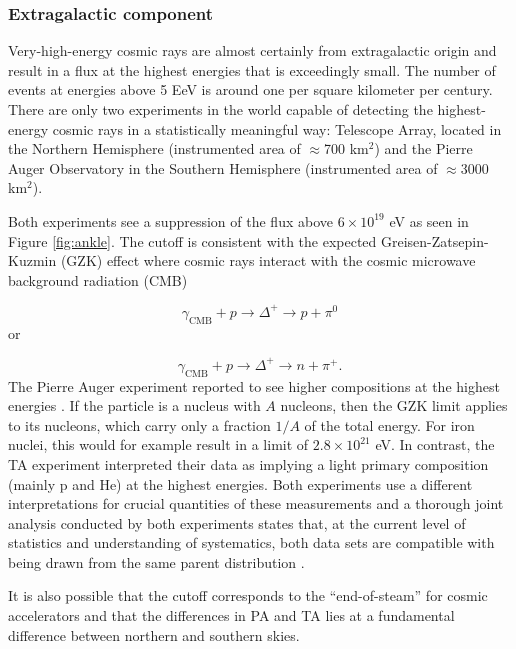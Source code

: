 \subsubsection{Extragalactic component}
\label{subsec:extragalactic}
Very-high-energy cosmic rays are almost certainly from extragalactic origin and result in a flux at the highest energies that is exceedingly small. The number of events at energies above 5 EeV is around one per square kilometer per century. There are only two experiments in the world capable of detecting the highest-energy cosmic rays in a statistically meaningful way: Telescope Array, located in the Northern Hemisphere (instrumented area of $\approx$700 km$^2$) and the Pierre Auger Observatory in the Southern Hemisphere (instrumented area of $\approx$3000 km$^2$).

Both experiments see a suppression of the flux above $6 \times 10^{19}$ eV as seen in Figure \ref{fig:ankle}. The cutoff is consistent with the expected Greisen-Zatsepin-Kuzmin (GZK) effect \cite{Greisen:1966jv,Zatsepin:1966jv} where cosmic rays interact with the cosmic microwave background radiation (CMB)

\begin{equation}
\gamma_{\textrm{CMB}} + p \rightarrow \Delta^+ \rightarrow p + \pi^0
\end{equation} 
or

\begin{equation}
\gamma_{\textrm{CMB}} + p \rightarrow \Delta^+ \rightarrow n + \pi^+.
\end{equation}
The Pierre Auger experiment reported to see higher compositions at the highest energies \cite{icrc2017:pa}. If the particle is a nucleus with $A$ nucleons, then the GZK limit applies to its nucleons, which carry only a fraction $1/A$ of the total energy. For iron nuclei, this would for example result in a limit of $2.8 \times 10^{21}$ eV. In contrast, the TA experiment interpreted their data as implying a light primary composition (mainly p and He) at the highest energies. Both experiments use a different interpretations for crucial quantities of these measurements and a thorough joint analysis conducted by both experiments states that, at the current level of statistics and understanding of systematics, both data sets are compatible with being drawn from the same parent distribution \cite{PDG2018url}.

It is also possible that the cutoff corresponds to the ``end-of-steam'' for cosmic accelerators \cite{Allard:2008gj} and that the differences in PA and TA lies at a fundamental difference between northern and southern skies.\\

